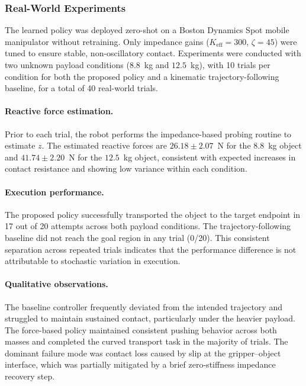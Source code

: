 \subsubsection{Real-World Experiments}

The learned policy was deployed zero-shot on a Boston Dynamics Spot mobile manipulator without retraining. Only impedance gains ($K_\text{eff} = 300$, $\zeta = 45$) were tuned to ensure stable, non-oscillatory contact. Experiments were conducted with two unknown payload conditions ($8.8$~kg and $12.5$~kg), with 10 trials per condition for both the proposed policy and a kinematic trajectory-following baseline, for a total of 40 real-world trials.

\paragraph{Reactive force estimation.} Prior to each trial, the robot performs the impedance-based probing routine to estimate $z$. The estimated reactive forces are $26.18 \pm 2.07$~N for the $8.8$~kg object and $41.74 \pm 2.20$~N for the $12.5$~kg object, consistent with expected increases in contact resistance and showing low variance within each condition.

\paragraph{Execution performance.} The proposed policy successfully transported the object to the target endpoint in 17 out of 20 attempts across both payload conditions. The trajectory-following baseline did not reach the goal region in any trial (0/20). This consistent separation across repeated trials indicates that the performance difference is not attributable to stochastic variation in execution.

\paragraph{Qualitative observations.} The baseline controller frequently deviated from the intended trajectory and struggled to maintain sustained contact, particularly under the heavier payload. The force-based policy maintained consistent pushing behavior across both masses and completed the curved transport task in the majority of trials. The dominant failure mode was contact loss caused by slip at the gripper--object interface, which was partially mitigated by a brief zero-stiffness impedance recovery step.
